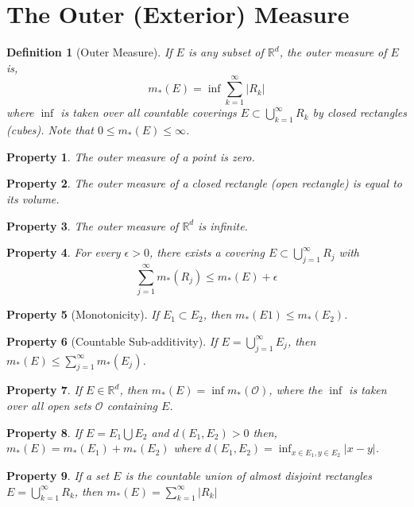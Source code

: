 \documentclass{report}
\theoremstyle{upthm}
\newtheorem{defn}{Definition}
\newtheorem{property}{Property}
\newcommand{\reals}{\mathbb{R}}
\newcommand{\calO}{{\mathcal{O}}}
\newcommand{\union}{\bigcup}
\newcommand{\vl}{\Big|}
\begin{document}
\section{The Outer (Exterior) Measure}

\begin{defn}[Outer Measure]
	If $E$ is any subset of $\reals^d$, the	outer measure of $E$ is,
	$$m_{*}(E) = \inf \sum_{k=1}^{\infty} \vl R_k \vl $$
	where $\inf$ is taken over all countable coverings $E \subset \union_{k=1}^{\infty} R_k$ by closed rectangles (cubes). Note that $0 \leq m_*(E) \leq \infty$.
\end{defn}

\begin{property}
	The outer measure of a point is zero.
\end{property}
\begin{property}
	The outer measure of a closed rectangle (open rectangle) is equal to its volume.
\end{property}
\begin{property}
	The outer measure of $\reals^d$ is infinite.
\end{property}
\begin{property}
	For every $\epsilon > 0$, there exists a covering $E \subset \union_{j=1}^{\infty} R_j$  with
	$$ \sum_{j=1}^{\infty} m_*(R_j) \leq m_*(E) + \epsilon $$
\end{property}
\begin{property}[Monotonicity]
	If $E_1 \subset E_2$, then $m_*(E1) \leq m_*(E_2)$.
\end{property}

\begin{property}[Countable Sub-additivity]
	If $E = \union_{j=1}^{\infty} E_j $, then $ m_*(E) \leq \sum_{j=1}^{\infty} m_*(E_j)$.
\end{property}

\begin{property}
	If $E \in \reals^d$, then $m_*(E) = \inf m_*(\calO)$, where the $\inf$ is taken over all open sets $\calO$ containing $E$.
\end{property}

\begin{property}
	If $E = E_1 \union E_2$ and $d(E_1, E_2) > 0$ then, $m_*(E) = m_*(E_1) + m_*(E_2)$ where $d(E_1, E_2) = \inf_{x \in E_1, y \in E_2} \vl x - y \vl$. 
\end{property}

\begin{property}
	If a set $E$ is the countable union of almost disjoint rectangles $ E = \union_{k=1}^{\infty} R_k $, then $m_*(E) = \sum_{k=1}^{\infty} \vl R_k \vl$
\end{property}
\end{document}
